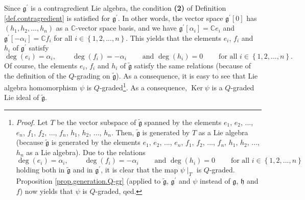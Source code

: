 \documentclass[etingof-lie.tex]{subfiles}
\begin{document}
\begin{vershort}
Since $\mathfrak{g}^{\prime}$ is a contragredient Lie algebra, the condition
\textbf{(2)} of Definition \ref{def.contragredient} is satisfied for
$\mathfrak{g}^{\prime}$. In other words, the vector space $\mathfrak{g}%
^{\prime}\left[  0\right]  $ has $\left(  h_{1},h_{2},...,h_{n}\right)  $ as a
$\mathbb{C}$-vector space basis, and we have $\mathfrak{g}^{\prime}\left[
\alpha_{i}\right]  =\mathbb{C}e_{i}$ and $\mathfrak{g}^{\prime}\left[
-\alpha_{i}\right]  =\mathbb{C}f_{i}$ for all $i\in\left\{  1,2,...,n\right\}
$. This yields that the elements $e_{i}$, $f_{i}$ and $h_{i}$ of
$\mathfrak{g}^{\prime}$ satisfy%
\[
\deg\left(  e_{i}\right)  =\alpha_{i},\ \ \ \ \ \ \ \ \ \ \deg\left(
f_{i}\right)  =-\alpha_{i}\ \ \ \ \ \ \ \ \ \ \text{and }\deg\left(
h_{i}\right)  =0\ \ \ \ \ \ \ \ \ \ \text{for all }i\in\left\{
1,2,...,n\right\}  .
\]
Of course, the elements $e_{i}$, $f_{i}$ and $h_{i}$ of
$\widetilde{\mathfrak{g}}$ satisfy the same relations (because of the
definition of the $Q$-grading on $\widetilde{\mathfrak{g}}$). As a
consequence, it is easy to see that Lie algebra homomorphism $\psi$ is
$Q$-graded\footnote{\textit{Proof.} Let $T$ be the vector subspace of
$\widetilde{\mathfrak{g}}$ spanned by the elements $e_{1}$, $e_{2}$, $...$,
$e_{n}$, $f_{1}$, $f_{2}$, $...$, $f_{n}$, $h_{1}$, $h_{2}$, $...$, $h_{n}$.
Then, $\widetilde{\mathfrak{g}}$ is generated by $T$ as a Lie algebra (because
$\widetilde{\mathfrak{g}}$ is generated by the elements $e_{1}$, $e_{2}$,
$...$, $e_{n}$, $f_{1}$, $f_{2}$, $...$, $f_{n}$, $h_{1}$, $h_{2}$, $...$,
$h_{n}$ as a Lie algebra). Due to the relations%
\[
\deg\left(  e_{i}\right)  =\alpha_{i},\ \ \ \ \ \ \ \ \ \ \deg\left(
f_{i}\right)  =-\alpha_{i}\ \ \ \ \ \ \ \ \ \ \text{and }\deg\left(
h_{i}\right)  =0\ \ \ \ \ \ \ \ \ \ \text{for all }i\in\left\{
1,2,...,n\right\}
\]
holding both in $\widetilde{\mathfrak{g}}$ and in $\mathfrak{g}^{\prime}$, it
is clear that the map $\psi\mid_{T}$ is $Q$-graded. Proposition
\ref{prop.generation.Q-gr} (applied to $\widetilde{\mathfrak{g}}$,
$\mathfrak{g}^{\prime}$ and $\psi$ instead of $\mathfrak{g}$, $\mathfrak{h}$
and $f$) now yields that $\psi$ is $Q$-graded, qed.}. As a consequence,
$\operatorname*{Ker}\psi$ is a $Q$-graded Lie ideal of
$\widetilde{\mathfrak{g}}$.
\end{vershort}
\end{document}
